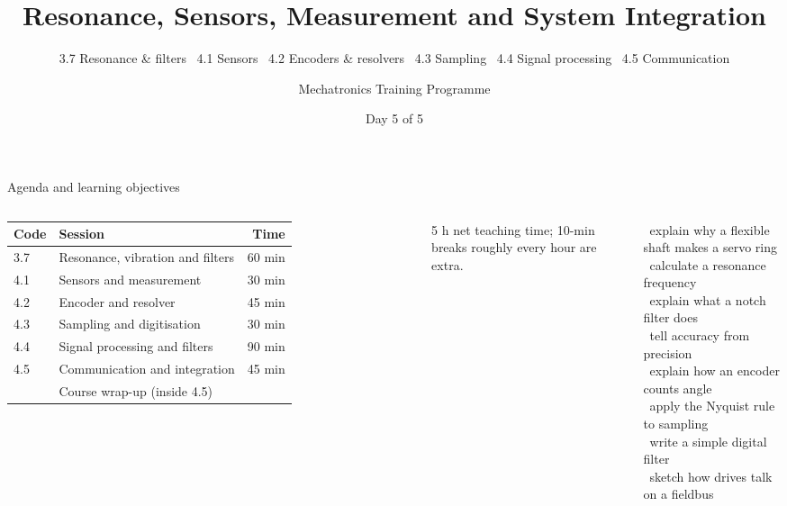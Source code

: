 \documentclass[aspectratio=169,10pt]{beamer}
\title[Day 5: Resonance, Sensors \& Integration]{Resonance, Sensors, Measurement and System Integration}
\subtitle{3.7 Resonance \& filters \textbullet\ 4.1 Sensors \textbullet\ 4.2 Encoders \& resolvers \textbullet\ 4.3 Sampling \textbullet\ 4.4 Signal processing \textbullet\ 4.5 Communication}
\author{Mechatronics Training Programme}
\institute{Theoretical Course Series}
\date{Day 5 of 5}
\begin{document}
\begin{frame}[plain]\titlepage\end{frame}

\begin{frame}{Agenda and learning objectives}
\begin{columns}[T]
\small
\renewcommand{\arraystretch}{1.12}
\begin{tabularx}{\linewidth}{@{}l X r@{}}
\toprule
\textbf{Code} & \textbf{Session} & \textbf{Time}\\
\midrule
3.7 & Resonance, vibration and filters & 60 min\\
4.1 & Sensors and measurement & 30 min\\
4.2 & Encoder and resolver & 45 min\\
4.3 & Sampling and digitisation & 30 min\\
4.4 & Signal processing and filters & 90 min\\
4.5 & Communication and integration & 45 min\\
\midrule
 & Course wrap-up (inside 4.5) & \\
\bottomrule
\end{tabularx}

\vspace{2mm}
{\footnotesize\color{mkGray} 5 h net teaching time; 10-min breaks roughly every hour are extra.}
\begin{keybox}
\small
\checkitem\ explain why a flexible shaft makes a servo ring\\
\checkitem\ calculate a resonance frequency\\
\checkitem\ explain what a notch filter does\\
\checkitem\ tell accuracy from precision\\
\checkitem\ explain how an encoder counts angle\\
\checkitem\ apply the Nyquist rule to sampling\\
\checkitem\ write a simple digital filter\\
\checkitem\ sketch how drives talk on a fieldbus
\end{keybox}
\end{columns}
\end{frame}
\end{document}
